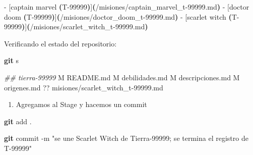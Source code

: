 \documentclass[
]{book}
\newenvironment{Shaded}{\begin{snugshade}}{\end{snugshade}}
\newcommand{\AttributeTok}[1]{\textcolor[rgb]{0.13,0.29,0.53}{#1}}
\newcommand{\CommentTok}[1]{\textcolor[rgb]{0.56,0.35,0.01}{\textit{#1}}}
\newcommand{\ErrorTok}[1]{\textcolor[rgb]{0.64,0.00,0.00}{\textbf{#1}}}
\newcommand{\ExtensionTok}[1]{#1}
\newcommand{\FunctionTok}[1]{\textcolor[rgb]{0.13,0.29,0.53}{\textbf{#1}}}
\newcommand{\KeywordTok}[1]{\textcolor[rgb]{0.13,0.29,0.53}{\textbf{#1}}}
\newcommand{\NormalTok}[1]{#1}
\newcommand{\StringTok}[1]{\textcolor[rgb]{0.31,0.60,0.02}{#1}}
\providecommand{\tightlist}{%
  \setlength{\itemsep}{0pt}\setlength{\parskip}{0pt}}
\begin{document}
\begin{Shaded}
\begin{Highlighting}[]
  \ExtensionTok{{-}}\NormalTok{ [captain marvel }\ErrorTok{(}\ExtensionTok{T{-}99999}\KeywordTok{)}\ExtensionTok{]}\ErrorTok{(}\ExtensionTok{/misiones/captain\_marvel\_t{-}99999.md}\KeywordTok{)}
  \ExtensionTok{{-}}\NormalTok{ [doctor doom }\ErrorTok{(}\ExtensionTok{T{-}99999}\KeywordTok{)}\ExtensionTok{]}\ErrorTok{(}\ExtensionTok{/misiones/doctor\_doom\_t{-}99999.md}\KeywordTok{)}
  \ExtensionTok{{-}}\NormalTok{ [scarlet witch }\ErrorTok{(}\ExtensionTok{T{-}99999}\KeywordTok{)}\ExtensionTok{]}\ErrorTok{(}\ExtensionTok{/misiones/scarlet\_witch\_t{-}99999.md}\KeywordTok{)}
\end{Highlighting}
\end{Shaded}

Verificando el estado del repositorio:

\begin{Shaded}
\begin{Highlighting}[]
\FunctionTok{git}\NormalTok{ s}
\end{Highlighting}
\end{Shaded}

\begin{Shaded}
\begin{Highlighting}[]
\CommentTok{\#\# tierra{-}99999}
 \ExtensionTok{M}\NormalTok{ README.md}
 \ExtensionTok{M}\NormalTok{ debilidades.md}
 \ExtensionTok{M}\NormalTok{ descripciones.md}
 \ExtensionTok{M}\NormalTok{ origenes.md}
\ExtensionTok{??}\NormalTok{ misiones/scarlet\_witch\_t{-}99999.md}
\end{Highlighting}
\end{Shaded}

\begin{enumerate}
\def\labelenumi{\arabic{enumi}.}
\setcounter{enumi}{6}
\tightlist
\item
  Agregamos al Stage y hacemos un commit
\end{enumerate}

\begin{Shaded}
\begin{Highlighting}[]
\FunctionTok{git}\NormalTok{ add .}
\end{Highlighting}
\end{Shaded}

\begin{Shaded}
\begin{Highlighting}[]
\FunctionTok{git}\NormalTok{ commit }\AttributeTok{{-}m} \StringTok{"se une Scarlet Witch de Tierra{-}99999; se termina el registro de T{-}99999"}
\end{Highlighting}
\end{Shaded}
\end{document}
